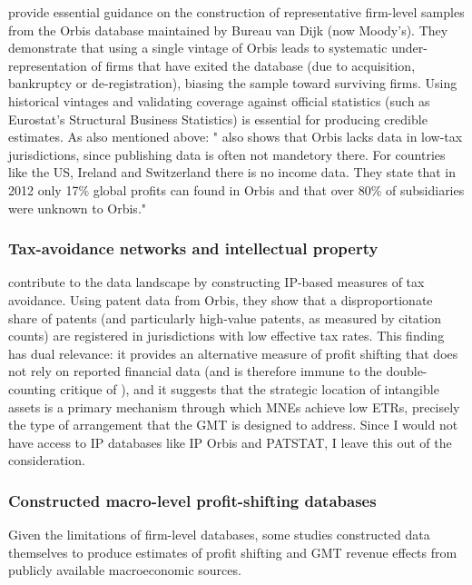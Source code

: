 \documentclass[11pt,a4paper]{article}
\begin{document}
\citet{ozcan2015} provide essential guidance on the construction of representative firm-level samples from the Orbis database maintained by Bureau van Dijk (now Moody's). They demonstrate that using a single vintage of Orbis leads to systematic under-representation of firms that have exited the database (due to acquisition, bankruptcy or de-registration), biasing the sample toward surviving firms. Using historical vintages and validating coverage against official statistics (such as Eurostat's Structural Business Statistics) is essential for producing credible estimates. As also mentioned above: "\citet{torslov2022} also shows that Orbis lacks data in low-tax jurisdictions, since publishing data is often not mandetory there. For countries like the US, Ireland and Switzerland there is no income data. They state that in 2012 only 17\% global profits can found in Orbis and that over 80\% of subsidiaries were unknown to Orbis."

\subsubsection{Tax-avoidance networks and intellectual property}

\citet{bilicka2023} contribute to the data landscape by constructing IP-based measures of tax avoidance. Using patent data from Orbis, they show that a disproportionate share of patents (and particularly high-value patents, as measured by citation counts) are registered in jurisdictions with low effective tax rates. This finding has dual relevance: it provides an alternative measure of profit shifting that does not rely on reported financial data (and is therefore immune to the double-counting critique of \citeauthor{blouin2023}), and it suggests that the strategic location of intangible assets is a primary mechanism through which MNEs achieve low ETRs, precisely the type of arrangement that the GMT is designed to address. Since I would not have access to IP databases like IP Orbis and PATSTAT, I leave this out of the consideration. 

\subsubsection{Constructed macro-level profit-shifting databases}

Given the limitations of firm-level databases, some studies constructed data themselves to produce estimates of profit shifting and GMT revenue effects from publicly available macroeconomic sources.
\end{document}
